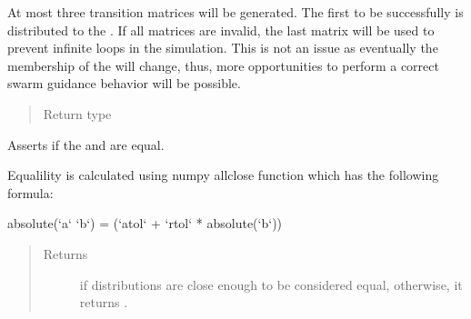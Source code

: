 \documentclass[letterpaper,10pt,english]{sphinxmanual}
\begin{document}
\begin{fulllineitems}
\begin{fulllineitems}
At most three transition matrices will be generated. The first to be
successfully {\hyperref[\detokenize{app.domain:app.domain.cluster_groups.SGCluster._validate_transition_matrix}]{}} is
distributed to the {\hyperref[\detokenize{app.domain:app.domain.network_nodes.SGNode}]{}}. If all matrices are invalid,
the last matrix will be used to prevent infinite loops in the
simulation. This is not an issue as eventually the membership of the
 will change, thus, more opportunities to perform a
correct swarm guidance behavior will be possible.
\begin{quote}\begin{description}
\item[{Return type}] \leavevmode
{}

\end{description}\end{quote}

\end{fulllineitems}


\begin{fulllineitems}
\label{\detokenize{app.domain:app.domain.cluster_groups.SGCluster.equal_distributions}}
Asserts if the {\hyperref[\detokenize{app.domain:app.domain.cluster_groups.SGCluster.v_}]{}} and
{\hyperref[\detokenize{app.domain:app.domain.cluster_groups.SGCluster.cv_}]{}} are equal.

Equalility is calculated using numpy allclose function which has the
following formula:

\begin{sphinxVerbatim}[commandchars=\\\{\}]
absolute(`a` \PYGZhy{} `b`) \PYGZlt{}= (`atol` + `rtol` * absolute(`b`))
\end{sphinxVerbatim}
\begin{quote}\begin{description}
\item[{Returns}] \leavevmode
{} if distributions are close enough to be considered equal,
otherwise, it returns .


\end{description}
\end{quote}
\end{fulllineitems}
\end{fulllineitems}
\end{document}
